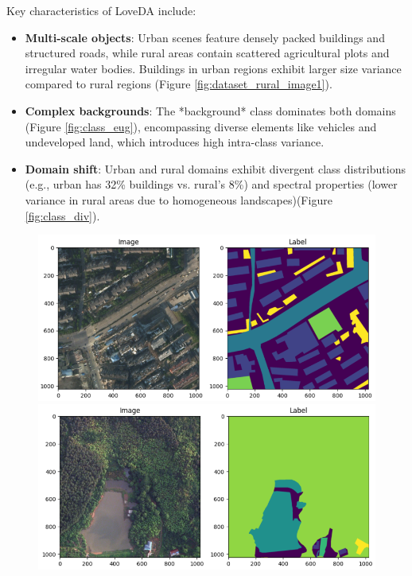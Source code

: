 \documentclass{article}
\begin{document}
\begin{multicols}{2}
		Key characteristics of LoveDA include:  
		\begin{itemize}  
			\item \textbf{Multi-scale objects}: Urban scenes feature densely packed buildings and structured roads, while rural areas contain scattered agricultural plots and irregular water bodies. Buildings in urban regions exhibit larger size variance compared to rural regions (Figure \ref{fig:dataset_rural_image1}).  
			\item \textbf{Complex backgrounds}: The *background* class dominates both domains (Figure \ref{fig:class_eug}), encompassing diverse elements like vehicles and undeveloped land, which introduces high intra-class variance.  
			\item \textbf{Domain shift}: Urban and rural domains exhibit divergent class distributions (e.g., urban has 32\% buildings vs. rural’s 8\%) and spectral properties (lower variance in rural areas due to homogeneous landscapes)(Figure \ref{fig:class_div}).  
		\end{itemize}  
		
		\begin{figure}[H]  

			\centering
			\begin{minipage}{1\linewidth}
				\centering
				\includegraphics[width=1\linewidth]{image/urban+mask2.png}
				
			\end{minipage}
			\begin{minipage}{1\linewidth}
				\centering
				\includegraphics[width=1\linewidth]{image/rural+mask5.png}
				

\end{minipage}
\end{figure}
\end{multicols}
\end{document}
